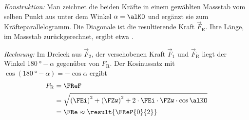 \emph{Konstruktion:} Man zeichnet die beiden Kräfte in einem gewählten Massstab vom selben Punkt aus unter dem Winkel $\alpha = \alKO$ und ergänzt sie zum Kräfteparallelogramm. Die Diagonale ist die resultierende Kraft $\vec F_\text{R}$. Ihre Länge, im Massstab zurückgerechnet, ergibt etwa .
\begin{center}
\end{center}

\emph{Rechnung:} Im Dreieck aus $\vec F_2$, der verschobenen Kraft $\vec F_1$ und $\vec F_\text{R}$ liegt der Winkel $\SI{180}{\degree}-\alpha$ gegenüber von $F_\text{R}$. Der Kosinussatz mit $\cos(\SI{180}{\degree}-\alpha) = -\cos\alpha$ ergibt
\begin{align}
 F_\text{R} &= \FReF \\
   &= \sqrt{\left(\FEi\right)^2+\left(\FZw\right)^2+2\cdot\FEi\cdot\FZw\cdot\cos\alKO} \\
   &= \FRe \approx \result{\FReP{0}{2}}
\end{align}
